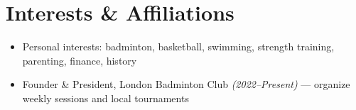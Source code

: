 \documentclass[letterpaper,11pt]{article}
\newcommand{\resumeItem}[1]{\item\small{{#1 \vspace{-2pt}}}}
\newcommand{\resumeItemListStart}{\begin{itemize}}
\newcommand{\resumeItemListEnd}{\end{itemize}\vspace{-5pt}}
\begin{document}
\section{Interests \& Affiliations}
\resumeItemListStart
  \resumeItem{Personal interests: badminton, basketball, swimming, strength training, parenting, finance, history}
  \resumeItem{Founder \& President, London Badminton Club \textit{(2022–Present)} — organize weekly sessions and local tournaments}
\resumeItemListEnd

\end{document}
